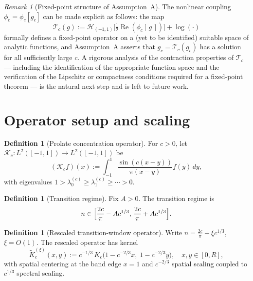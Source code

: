 \documentclass[12pt,a4paper]{amsart}
\theoremstyle{definition}
\newtheorem{definition}[theorem]{Definition}
\theoremstyle{remark}
\newtheorem{remark}[theorem]{Remark}
\newcommand{\Kc}{\mathcal{K}_c}
\newcommand{\lambdac}[2]{\lambda_{#2}^{(#1)}}
\begin{document}
\begin{remark}[Fixed-point structure of Assumption~A]
\label{rem:fixpoint}
The nonlinear coupling $\phi_c = \phi_c[g_c]$ can be made
explicit as follows: the map
\[
  \mathcal{T}_c(g)
  := \mathcal{H}_{(-1,1)}\bigl[\tfrac{1}{2}
  \operatorname{Re}(\phi_c[\,g\,])\bigr] + \log(\cdot)
\]
formally defines a fixed-point operator on a (yet to be
identified) suitable space of analytic functions, and
Assumption~A asserts that $g_c = \mathcal{T}_c(g_c)$ has a
solution for all sufficiently large $c$.
A rigorous analysis of the contraction properties of
$\mathcal{T}_c$ --- including the identification of the
appropriate function space and the verification of the
Lipschitz or compactness conditions required for a
fixed-point theorem --- is the natural next step and is
left to future work.
\end{remark}

\section{Operator setup and scaling}
\label{sec:setup}

\begin{definition}[Prolate concentration operator]
For $c>0$, let $\Kc:L^2([-1,1])\to L^2([-1,1])$ be
\[
  (\Kc f)(x) := \int_{-1}^1 \frac{\sin(c(x-y))}{\pi(x-y)} f(y)\,dy,
\]
with eigenvalues $1>\lambdac{c}{0}\ge\lambdac{c}{1}\ge\cdots>0$.
\end{definition}

\begin{definition}[Transition regime]
Fix $A>0$. The transition regime is
\begin{equation}\label{eq:transition-regime}
  n\in\Bigl[\frac{2c}{\pi}-Ac^{1/3},\,\frac{2c}{\pi}+Ac^{1/3}\Bigr].
\end{equation}
\end{definition}

\begin{definition}[Rescaled transition-window operator]
\label{def:rescaled-operator}
Write $n=\frac{2c}{\pi}+\xi c^{1/3}$, $\xi=O(1)$.
The rescaled operator has kernel
\[
  \widetilde K_c^{(\xi)}(x,y)
  := c^{-1/3}\,K_c\!\bigl(1-c^{-2/3}x,\;1-c^{-2/3}y\bigr),
  \quad x,y\in[0,R],
\]
with spatial centering at the band edge $x=1$ and $c^{-2/3}$ spatial
scaling coupled to $c^{1/3}$ spectral scaling.
\end{definition}
\end{document}
